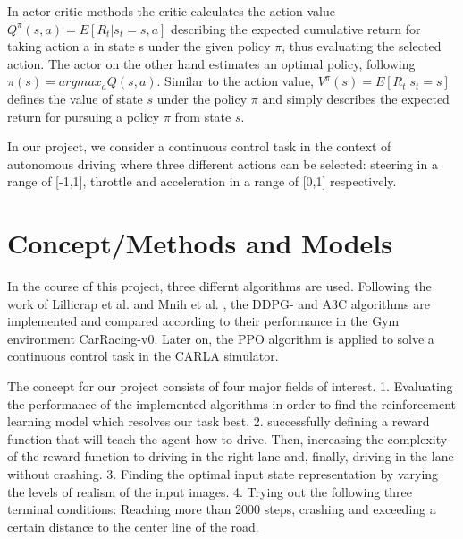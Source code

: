 \documentclass[letterpaper, 10 pt, conference]{ieeeconf}  %
\begin{document}
In actor-critic methods the critic calculates the action value $Q^\pi(s,a) = E[R_t|s_t=s,a]$ describing the expected cumulative return for taking action a in state s under the given policy $\pi$, thus evaluating the selected action. The actor on the other hand estimates an optimal policy, following $\pi(s) = argmax_aQ(s,a)$. Similar to the action value, $V^\pi(s) = E[R_t|s_t=s]$ defines the value of state $s$ under the policy $\pi$ and simply describes the expected return for pursuing a policy $\pi$ from state $s$.

In our project, we consider a continuous control task in the context of autonomous driving where three different actions can be selected: steering in a range of [-1,1], throttle  and acceleration in a range of [0,1] respectively.

\section{Concept/Methods and Models}

In the course of this project, three differnt algorithms are used. Following the work of Lillicrap et al. \cite{journals/corr/LillicrapHPHETS15} and Mnih et al. \cite{mnihAsynchronousMethodsDeep2016}, the DDPG- and A3C algorithms are implemented and compared according to their performance in the Gym environment CarRacing-v0. Later on, the PPO algorithm is applied to solve a continuous control task in the CARLA simulator.

The concept for our project consists of four major fields of interest. 1. Evaluating the performance of the implemented algorithms in order to find the reinforcement learning model which resolves our task best. 2. successfully defining a reward function that will teach the agent how to drive. Then, increasing the complexity of the reward function to driving in the right lane and, finally, driving in the lane without crashing. 3. Finding the optimal input state representation by varying the levels of realism of the input images. 4. Trying out the following three terminal conditions: Reaching more than 2000 steps, crashing and exceeding a certain distance to the center line of the road.
\end{document}
